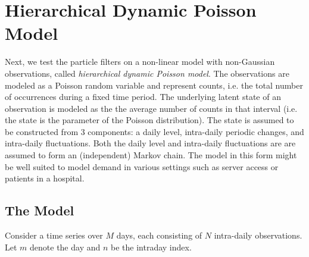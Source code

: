 \documentclass[11pt, oneside]{scrreprt}   	%
\begin{document}
\newpage
\section{Hierarchical Dynamic Poisson Model}
Next, we test the particle filters on a non-linear model with non-Gaussian observations, called \textit{hierarchical dynamic Poisson model}. The observations are modeled as a Poisson random variable and represent counts, i.e. the total number of occurrences during a fixed time period. The underlying latent state of an observation is modeled as the the average number of counts in that interval (i.e. the state is the parameter of the Poisson distribution). The state is assumed to be constructed from 3 components: a daily level, intra-daily periodic changes, and intra-daily fluctuations. Both the daily level and intra-daily fluctuations are are assumed to form an (independent) Markov chain. The model in this form might be well suited to model demand in various settings such as server access or patients in a hospital.

\subsection{The Model}
Consider a time series over $M$ days, each consisting of $N$ intra-daily observations. 
Let $m$ denote the day and $n$ be the intraday index.
\end{document}
